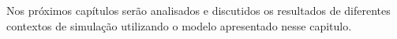 Nos próximos capítulos serão analisados e discutidos os resultados de diferentes contextos de simulação utilizando o modelo apresentado nesse capitulo.



